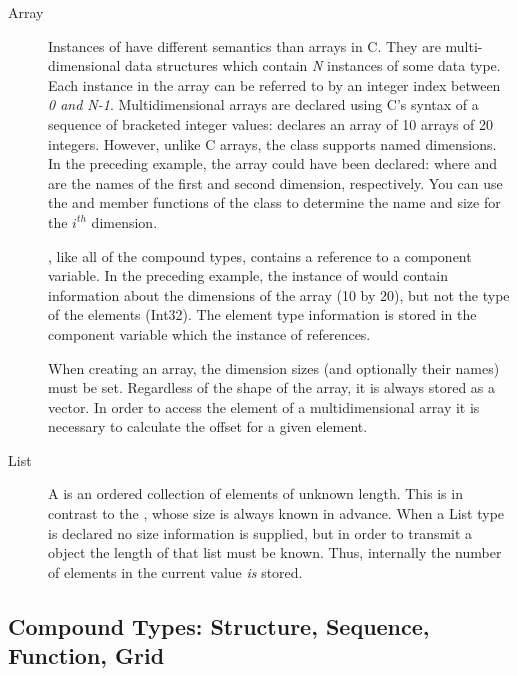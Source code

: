 \begin{description}
  
\item[Array] Instances of  have different semantics than
  arrays in C.  They are multi-dimensional data structures which
  contain \emph{N} instances of some data type. Each instance in the
  array can be referred to by an integer index between \emph{0 and
    N-1}. Multidimensional arrays are declared using C's syntax of a
  sequence of bracketed integer values:  declares
  an array of 10 arrays of 20 integers. However, unlike C arrays, the
   class supports named dimensions. In the preceding
  example, the array could have been declared:  where  and  are the names of the
  first and second dimension, respectively. You can use the
   and  member functions of
  the  class to determine the name and size for the
  $i^{th}$ dimension.
  
  , like all of the compound types, contains a reference to a
  component variable. In the preceding example, the instance of 
  would contain information about the dimensions of the array (10 by 20), but
  not the type of the elements (Int32). The element type information is
  stored in the component variable which the instance of 
  references.
  
  When creating an array, the dimension sizes (and optionally their
  names) must be set.  Regardless of the shape of the array, it is
  always stored as a vector.  In order to access the element of a
  multidimensional array it is necessary to calculate the offset for a
  given element.
  
\item[List] A  is an ordered collection of elements of
  unknown length.  This is in contrast to the , whose
  size is always known in advance. When a List type is declared no
  size information is supplied, but in order to transmit a
   object the length of that list must be known.  Thus,
  internally the number of elements in the current value \emph{is}
  stored.

\end{description}

\subsection{Compound Types: Structure, Sequence, Function, Grid}

